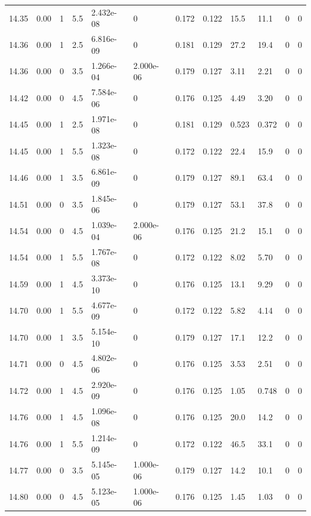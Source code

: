 \documentclass[preview]{standalone}
\begin{document}
{{{{{{{{{{{{{{\begin{tabular}{L{1.2cm}C{1.2cm} C{0.3cm}C{0.5cm} C{1.4cm}C{1.4cm} C{1.4cm}C{1.4cm} C{1.6cm}C{1.6cm} C{1.6cm}C{1.6cm}}
  14.35  &  0.00  & 1     & 5.5 &  2.432e-08  & 0  &  0.172&   0.122& 15.5 & 11.1   &  0 & 0  \\ 
  14.36  &  0.00  & 1     & 2.5 &  6.816e-09  & 0  &  0.181&   0.129& 27.2 & 19.4   &  0 & 0  \\ 
  14.36  &  0.00  & 0     & 3.5 &  1.266e-04  & 2.000e-06  &  0.179&   0.127& 3.11 & 2.21   &  0 & 0  \\ 
  14.42  &  0.00  & 0     & 4.5 &  7.584e-06  & 0  &  0.176&   0.125& 4.49 & 3.20   &  0 & 0  \\ 
  14.45  &  0.00  & 1     & 2.5 &  1.971e-08  & 0  &  0.181&   0.129& 0.523 & 0.372   &  0 & 0  \\ 
  14.45  &  0.00  & 1     & 5.5 &  1.323e-08  & 0  &  0.172&   0.122& 22.4 & 15.9   &  0 & 0  \\ 
  14.46  &  0.00  & 1     & 3.5 &  6.861e-09  & 0  &  0.179&   0.127& 89.1 & 63.4   &  0 & 0  \\ 
  14.51  &  0.00  & 0     & 3.5 &  1.845e-06  & 0  &  0.179&   0.127& 53.1 & 37.8   &  0 & 0  \\ 
  14.54  &  0.00  & 0     & 4.5 &  1.039e-04  & 2.000e-06  &  0.176&   0.125& 21.2 & 15.1   &  0 & 0  \\ 
  14.54  &  0.00  & 1     & 5.5 &  1.767e-08  & 0  &  0.172&   0.122& 8.02 & 5.70   &  0 & 0  \\ 
  14.59  &  0.00  & 1     & 4.5 &  3.373e-10  & 0  &  0.176&   0.125& 13.1 & 9.29   &  0 & 0  \\ 
  14.70  &  0.00  & 1     & 5.5 &  4.677e-09  & 0  &  0.172&   0.122& 5.82 & 4.14   &  0 & 0  \\ 
  14.70  &  0.00  & 1     & 3.5 &  5.154e-10  & 0  &  0.179&   0.127& 17.1 & 12.2   &  0 & 0  \\ 
  14.71  &  0.00  & 0     & 4.5 &  4.802e-06  & 0  &  0.176&   0.125& 3.53 & 2.51   &  0 & 0  \\ 
  14.72  &  0.00  & 1     & 4.5 &  2.920e-09  & 0  &  0.176&   0.125& 1.05 & 0.748   &  0 & 0  \\ 
  14.76  &  0.00  & 1     & 4.5 &  1.096e-08  & 0  &  0.176&   0.125& 20.0 & 14.2   &  0 & 0  \\ 
  14.76  &  0.00  & 1     & 5.5 &  1.214e-09  & 0  &  0.172&   0.122& 46.5 & 33.1   &  0 & 0  \\ 
  14.77  &  0.00  & 0     & 3.5 &  5.145e-05  & 1.000e-06  &  0.179&   0.127& 14.2 & 10.1   &  0 & 0  \\ 
  14.80  &  0.00  & 0     & 4.5 &  5.123e-05  & 1.000e-06  &  0.176&   0.125& 1.45 & 1.03   &  0 & 0  \\ 

\end{tabular}}}}}}}}}}}}}}}
\end{document}
